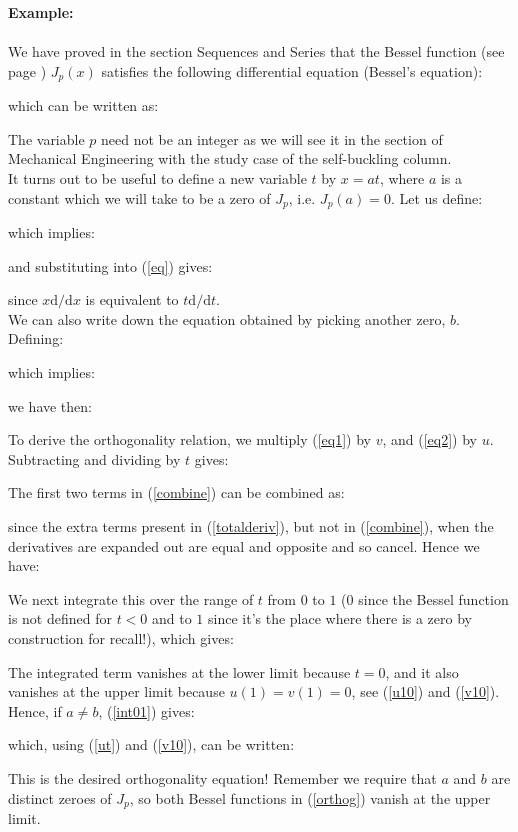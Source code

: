 	\begin{tcolorbox}[colframe=black,colback=white,sharp corners,breakable]
	\textbf{{\Large {}}Example:}\\\\
	We have proved in the section Sequences and Series that the Bessel function (see page \pageref{bessel functions}) $J_p(x)$ satisfies the following differential equation (Bessel's equation):
	
	which can be written as:
	
	The variable $p$ need not be an integer as we will see it in the section of Mechanical Engineering with the study case of the self-buckling column.\\
	
	It turns out to be useful to define a new variable $t$ by $x = a t$, where $a$ is a constant which we will take to be a zero of $J_p$, i.e. $J_p(a) = 0$. Let us define:
	
	which implies:
	
	and substituting into (\ref{eq}) gives:
	
	since $x \mathrm{d}/\mathrm{d}x$ is equivalent to $t \mathrm{d}/\mathrm{d}t$.\\
	
	We can also write down the equation obtained by picking another zero, $b$. Defining:
	
	which implies:
	
	we have then:
	
	To derive the orthogonality relation, we multiply (\ref{eq1}) by $v$, and (\ref{eq2}) by $u$. Subtracting and dividing by $t$ gives:
	
	The first two terms in (\ref{combine}) can be combined as:
	
	since the extra terms present in (\ref{totalderiv}), but not in (\ref{combine}), when the derivatives are expanded out are equal and opposite and so cancel. Hence we have:
	
	We next integrate this over the range of $t$ from $0$ to $1$ ($0$ since the Bessel function is not defined for $t<0$ and to $1$ since it's the place where there is a zero by construction for recall!), which gives:
	
	The integrated term vanishes at the lower limit because $t=0$, and it also vanishes at the upper limit because $u(1) = v(1) = 0$, see (\ref{u10}) and (\ref{v10}). Hence, if $a \ne b$, (\ref{int01}) gives:
	
	which, using (\ref{ut}) and (\ref{v10}), can be written:
	
	This is the desired orthogonality equation! Remember we require that $a$ and $ b$ are distinct zeroes of $J_p$, so both Bessel functions in (\ref{orthog}) vanish at the upper limit.
	\end{tcolorbox}
	
